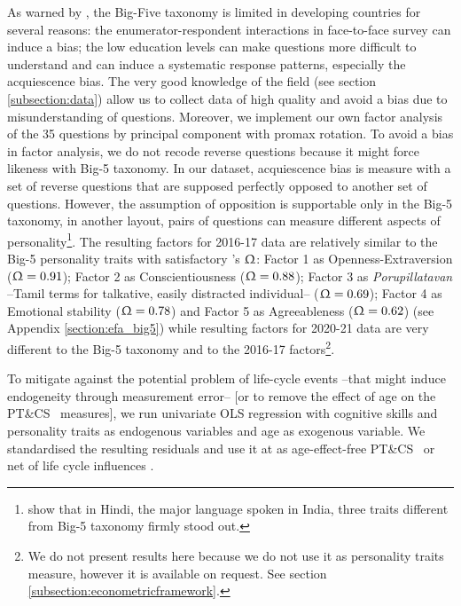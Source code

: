 \documentclass[a4paper, 11pt, onecolumn]{article}
\newcommand{\PTCS}{PT\&CS}
\begin{document}
As warned by \cite{Laajaj2019}, the Big-Five taxonomy is limited in developing countries for several reasons: the enumerator-respondent interactions in face-to-face survey can induce a bias; the low education levels can make questions more difficult to understand and can induce a systematic response patterns, especially the acquiescence bias.
The very good knowledge of the field (see section \ref{subsection:data}) allow us to collect data of high quality and avoid a bias due to misunderstanding of questions.
Moreover, we implement our own factor analysis of the 35 questions by principal component with promax rotation.
To avoid a bias in factor analysis, we do not recode reverse questions because it might force likeness with Big-5 taxonomy.
In our dataset, acquiescence bias is measure with a set of reverse questions that are supposed perfectly opposed to another set of questions. 
However, the assumption of opposition is supportable only in the Big-5 taxonomy, in another layout, pairs of questions can measure different aspects of personality\footnote{\cite{Singh2013} show that in Hindi, the major language spoken in India, three traits different from Big-5 taxonomy firmly stood out.}.
The resulting factors for 2016-17 data are relatively similar to the Big-5 personality traits with satisfactory \citeauthor{McDonald1999}'s $\Upomega$: Factor 1 as Openness-Extraversion ($\Upomega=0.91$); Factor 2 as Conscientiousness ($\Upomega=0.88$); Factor 3 as \textit{Porupillatavan} --Tamil terms for talkative, easily distracted individual-- ($\Upomega=0.69$); Factor 4 as Emotional stability ($\Upomega=0.78$) and Factor 5 as Agreeableness ($\Upomega=0.62$) (see Appendix \ref{section:efa_big5}) while resulting factors for 2020-21 data are very different to the Big-5 taxonomy and to the 2016-17 factors\footnote{We do not present results here because we do not use it as personality traits measure, however it is available on request. See section \ref{subsection:econometricframework}.}.

To mitigate against the potential problem of life-cycle events --that might induce endogeneity through measurement error-- [or to remove the effect of age on the \PTCS~ measures], we run univariate OLS regression with cognitive skills and personality traits as endogenous variables and age as exogenous variable. %
We standardised the resulting residuals and use it at as age-effect-free \PTCS~ or net of life cycle influences \citep{Nyhus2005, Brown2014, Groves2005}. 
\end{document}
